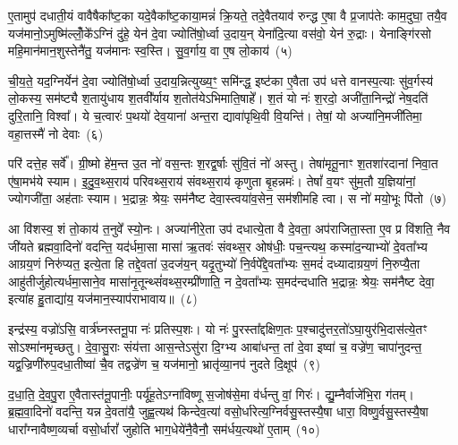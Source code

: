 ए॒तामुप॑ दधाती॒यं वावैषैका᳚ष्ट॒का यदे॒वैका᳚ष्ट॒काया॒मन्नं॑ क्रि॒यते॒ तदे॒वैतयाव॑ रुन्द्ध ए॒षा वै प्र॒जाप॑तेः काम॒दुघा॒ तयै॒व यज॑मानो॒\-ऽमुष्मि॑ल्लोँ॒के᳚\-ऽग्निं दु॑हे॒ येन॑ दे॒वा ज्योति॑षो॒र्ध्वा उ॒दाय॒न् येना॑दि॒त्या वस॑वो॒ येन॑ रु॒द्राः। येनाङ्गि॑रसो महि॒मान॑मान॒शुस्तेनै॑तु॒ यज॑मानः स्व॒स्ति। सु॒व॒र्गाय॒ वा ए॒ष लो॒काय॑~(५)

ची॒य॒ते॒ यद॒ग्निर्येन॑ दे॒वा ज्योति॑षो॒र्ध्वा उ॒दाय॒न्नित्युख्य॒ꣳ॒ समि॑न्द्ध॒ इष्ट॑का ए॒वैता उप॑ धत्ते वानस्प॒त्याः सु॑व॒र्गस्य॑ लो॒कस्य॒ सम॑ष्ट्यै श॒तायु॑धाय श॒तवी᳚र्याय श॒तोत॑ये\-ऽभिमाति॒षाहे᳚। श॒तं यो नः॑ श॒रदो॒ अजी॑ता॒निन्द्रो॑ नेष॒दति॑ दुरि॒तानि॒ विश्वा᳚। ये च॒त्वारः॑ प॒थयो॑ देव॒याना॑ अन्त॒रा द्यावा॑पृथि॒वी वि॒यन्ति॑। तेषां॒ यो अज्या॑नि॒मजी॑तिमा॒ वहा॒त्तस्मै॑ नो देवाः~(६)

परि॑ दत्ते॒ह सर्वे᳚। ग्री॒ष्मो हे॑म॒न्त उ॒त नो॑ वस॒न्तः श॒रद्व॒र्\mbox{}षाः सु॑वि॒तं नो॑ अस्तु। तेषा॑मृतू॒नाꣳ श॒तशा॑रदानां निवा॒त ए॑षा॒मभ॑ये स्याम। इ॒दु॒व॒थ्स॒राय॑ परिवथ्स॒राय॑ संवथ्स॒राय॑ कृणुता बृ॒हन्नमः॑। तेषां᳚ व॒यꣳ सु॑म॒तौ य॒ज्ञिया॑नां॒ ज्योगजी॑ता॒ अह॑ताः स्याम। भ॒द्रान्नः॒ श्रेयः॒ सम॑नैष्ट देवा॒स्त्वया॑व॒सेन॒ सम॑शीमहि त्वा। स नो॑ मयो॒भूः पि॑तो~(७)

आ वि॑शस्व॒ शं तो॒काय॑ त॒नुवे᳚ स्यो॒नः। अज्या॑नीरे॒ता उप॑ दधात्ये॒ता वै दे॒वता॒ अप॑राजिता॒स्ता ए॒व प्र वि॑शति॒ नैव जी॑यते ब्रह्मवा॒दिनो॑ वदन्ति॒ यद॑र्धमा॒सा मासा॑ ऋ॒तवः॑ संवथ्स॒र ओष॑धीः॒ पच॒न्त्यथ॒ कस्मा॑द॒न्याभ्यो॑ दे॒वता᳚भ्य आग्रय॒णं निरु॑प्यत॒ इत्ये॒ता हि तद्दे॒वता॑ उ॒दज॑य॒न् यदृ॒तुभ्यो॑ नि॒र्वपे᳚द्दे॒वता᳚भ्यः स॒मदं॑ दध्यादाग्रय॒णं नि॒रुप्यै॒ता आहु॑तीर्जुहोत्यर्धमा॒साने॒व मासा॑नृ॒तून्थ्सं॑वथ्स॒रम्प्री॑णाति॒ न दे॒वता᳚भ्यः स॒मद॑न्दधाति भ॒द्रान्नः॒ श्रेयः॒ सम॑नैष्ट देवा॒ इत्या॑ह हु॒ताद्या॑य॒ यज॑मान॒स्याप॑राभावाय॥~(८)

{\anuvakamend[{प्रा॒जा॒प॒त्याल्लोँ॒काय॑ देवाः पितो दध्यादाग्रय॒णं पञ्च॑विꣳशतिश्च}]}%

इन्द्र॑स्य॒ वज्रो॑\-ऽसि॒ वार्त्र॑घ्नस्तनू॒पा नः॑ प्रतिस्प॒शः। यो नः॑ पु॒रस्ता᳚द्दक्षिण॒तः प॒श्चादु॑त्तर॒तो॑\-ऽघा॒युर॑भि॒दास॑त्ये॒तꣳ सो\-ऽश्मा॑नमृच्छतु। दे॒वा॒सु॒राः संय॑त्ता आस॒न्ते\-ऽसु॑रा दि॒ग्भ्य आबा॑धन्त॒ तां दे॒वा इष्वा॑ च॒ वज्रे॑ण॒ चापा॑नुदन्त॒ यद्व॒ज्रिणी॑रुप॒दधा॒तीष्वा॑ चै॒व तद्वज्रे॑ण च॒ यज॑मानो॒ भ्रातृ॑व्या॒नप॑ नुदते दि॒क्षूप॑~(९)

द॒धा॒ति॒ दे॒व॒पु॒रा ए॒वैतास्त॑नू॒पानीः॒ पर्यू॑ह॒ते\-ऽग्ना॑विष्णू स॒जोष॑से॒मा व॑र्धन्तु वां॒ गिरः॑। द्यु॒म्नैर्वाजे॑भि॒रा ग॑तम्। ब्र॒ह्म॒वा॒दिनो॑ वदन्ति॒ यन्न दे॒वता॑यै॒ जुह्व॒त्यथ॑ किन्देव॒त्या॑ वसो॒र्धारेत्य॒ग्निर्वसु॒स्तस्यै॒षा धारा॒ विष्णु॒र्वसु॒स्तस्यै॒षा धारा᳚ग्नावैष्ण॒व्यर्चा वसो॒र्धारां᳚ जुहोति भाग॒धेये॑नै॒वैनौ॒ सम॑र्धय॒त्यथो॑ ए॒ताम्~(१०)

